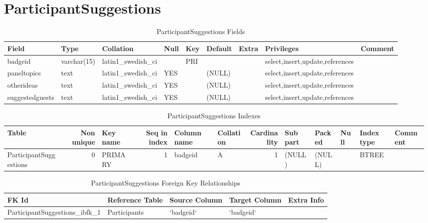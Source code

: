 \documentclass[captions=tablesignature]{scrartcl}
\begin{document}
\section{ParticipantSuggestions}
\label{sec-12}

\begin{table}[htb]
\caption{\label{tbl:participantsuggestionsfields}ParticipantSuggestions Fields}
\centering
\begin{tabular}{lllllllll}
\hline
Field & Type & Collation & Null & Key & Default & Extra & Privileges & Comment\\
\hline
badgeid & varchar(15) & latin1\_swedish\_ci &  & PRI &  &  & select,insert,update,references & \\
paneltopics & text & latin1\_swedish\_ci & YES &  & (NULL) &  & select,insert,update,references & \\
otherideas & text & latin1\_swedish\_ci & YES &  & (NULL) &  & select,insert,update,references & \\
suggestedguests & text & latin1\_swedish\_ci & YES &  & (NULL) &  & select,insert,update,references & \\
\hline
\end{tabular}
\end{table}

\begin{table}[htb]
\caption{\label{tbl:participantsuggestionsindexes}ParticipantSuggestions Indexes}
\centering
\begin{tabular}{lrlrllrlllll}
\hline
Table & Non unique & Key name & Seq in index & Column name & Collation & Cardinality & Sub part & Packed & Null & Index type & Comment\\
\hline
ParticipantSuggestions & 0 & PRIMARY & 1 & badgeid & A & 1 & (NULL) & (NULL) &  & BTREE & \\
\hline
\end{tabular}
\end{table}

\begin{table}[htb]
\caption{\label{tbl:participantsuggestionsfkr}ParticipantSuggestions Foreign Key Relationships}
\centering
\begin{tabular}{lllll}
\hline
FK Id & Reference Table & Source Column & Target Column & Extra Info\\
\hline
ParticipantSuggestions\_ibfk\_1 & Participants & `badgeid` & `badgeid` & \\
\hline
\end{tabular}
\end{table}
\end{document}
